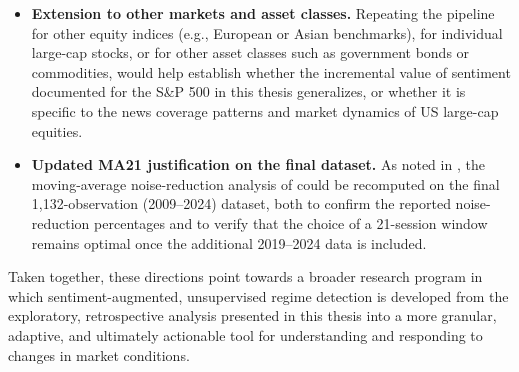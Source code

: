 \begin{itemize}
  \item \textbf{Extension to other markets and asset classes.} Repeating
  the pipeline for other equity indices (e.g., European or Asian
  benchmarks), for individual large-cap stocks, or for other asset classes
  such as government bonds or commodities, would help establish whether
  the incremental value of sentiment documented for the S\&P 500 in this
  thesis generalizes, or whether it is specific to the news coverage
  patterns and market dynamics of US large-cap equities.

  \item \textbf{Updated MA21 justification on the final dataset.} As noted
  in , the moving-average noise-reduction
  analysis of  could be recomputed on the
  final 1,132-observation (2009--2024) dataset, both to confirm the
  reported noise-reduction percentages and to verify that the choice of a
  21-session window remains optimal once the additional 2019--2024 data is
  included.
\end{itemize}

Taken together, these directions point towards a broader research program
in which sentiment-augmented, unsupervised regime detection is developed
from the exploratory, retrospective analysis presented in this thesis into
a more granular, adaptive, and ultimately actionable tool for
understanding and responding to changes in market conditions.
